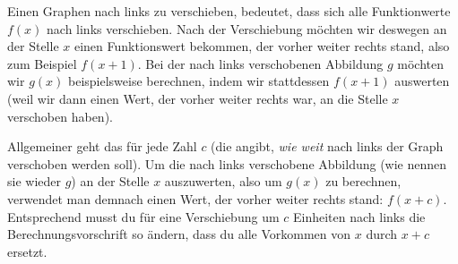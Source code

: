 \documentclass[../../main.tex]{subfiles}
\begin{document}
Einen Graphen nach links zu verschieben, bedeutet, dass sich alle Funktionwerte $f(x)$ nach links verschieben. Nach der Verschiebung möchten wir deswegen an der Stelle $x$ einen Funktionswert bekommen, der vorher weiter rechts stand, also zum Beispiel $f(x+1)$. Bei der nach links verschobenen Abbildung $g$ möchten wir $g(x)$ beispielsweise berechnen, indem wir stattdessen $f(x+1)$ auswerten (weil wir dann einen Wert, der vorher weiter rechts war, an die Stelle $x$ verschoben haben).

Allgemeiner geht das für jede Zahl $c$ (die angibt, \emph{wie weit} nach links der Graph verschoben werden soll). Um die nach links verschobene Abbildung (wie nennen sie wieder $g$) an der Stelle $x$ auszuwerten, also um $g(x)$ zu berechnen, verwendet man demnach einen Wert, der vorher weiter rechts stand: $f(x+c)$. Entsprechend musst du für eine Verschiebung um $c$ Einheiten nach links die Berechnungsvorschrift so ändern, dass du alle Vorkommen von $x$ durch $x+c$ ersetzt.
\end{document}
